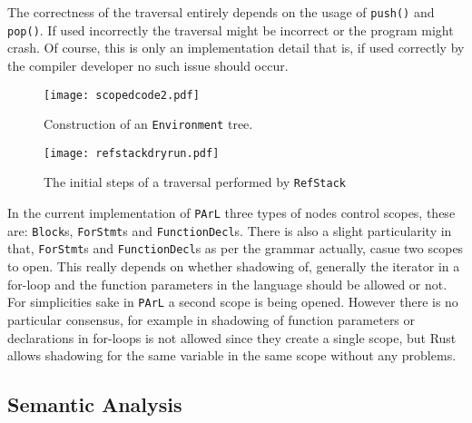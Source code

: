 

\begin{marker}
The correctness of the traversal entirely depends on the usage
of \texttt{push()} and \texttt{pop()}. If used incorrectly the
traversal might be incorrect or the program might crash. Of
course, this is only an implementation detail that is, if used
correctly by the compiler developer no such issue should occur.
\end{marker}

\begin{figure}[H]
\centering
\begin{mdframed}[backgroundcolor=UMPaleRed]
\texttt{[image: scopedcode2.pdf]}
\end{mdframed}
\caption{Construction of an \texttt{Environment} tree.}
\label{fig:scopedcode2}
\end{figure}

\begin{figure}[H]
\centering
\begin{mdframed}[backgroundcolor=UMPaleRed]
\texttt{[image: refstackdryrun.pdf]}
\end{mdframed}
\caption{The initial steps of a traversal performed by
\texttt{RefStack}}
\label{fig:refstackdryrun}
\end{figure}

In the current implementation of \texttt{PArL} three types of
nodes control scopes, these are: \texttt{Block}s,
\texttt{ForStmt}s and \texttt{FunctionDecl}s. There is also a
slight particularity in that, \texttt{ForStmt}s and
\texttt{FunctionDecl}s as per the grammar actually, casue two
scopes to open. This really depends on whether shadowing of,
generally the iterator in a for-loop and the function parameters
in the language should be allowed or not. For simplicities sake
in \texttt{PArL} a second scope is being opened. However there
is no particular consensus, for example in \CC{} shadowing of
function parameters or declarations in for-loops is not allowed
since they create a single scope, but Rust allows shadowing for
the same variable in the same scope without any problems.

\subsection{Semantic Analysis}

